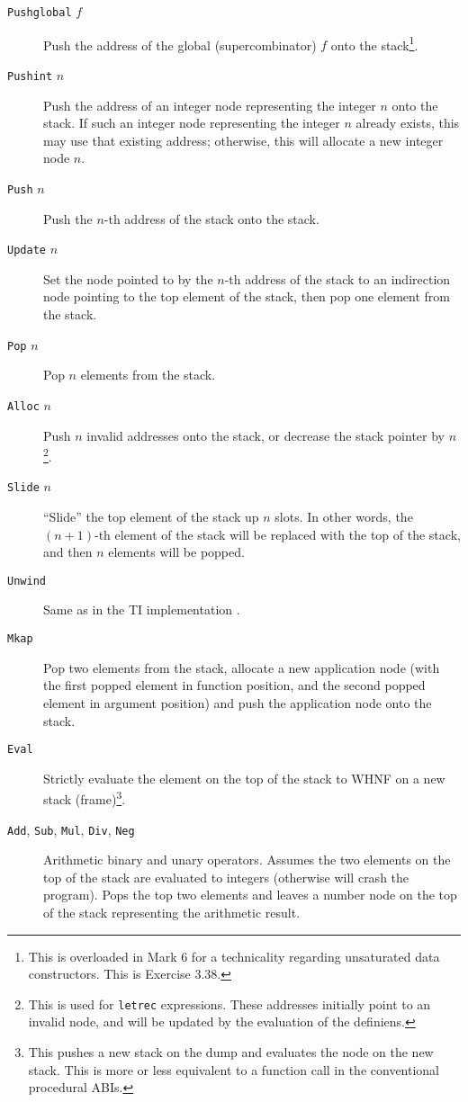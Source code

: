 \begin{description}
\item[\texttt{Pushglobal} $f$] Push the address of the global (supercombinator) $f$ onto the stack\footnote{This is overloaded in Mark 6 for a technicality regarding unsaturated data constructors. This is Exercise 3.38.}.
\item[\texttt{Pushint} $n$] Push the address of an integer node representing the integer $n$ onto the stack. If such an integer node representing the integer $n$ already exists, this may use that existing address; otherwise, this will allocate a new integer node $n$.
\item[\texttt{Push} $n$] Push the $n$-th address of the stack onto the stack.
\item[\texttt{Update} $n$] Set the node pointed to by the $n$-th address of the stack to an indirection node pointing to the top element of the stack, then pop one element from the stack.
\item[\texttt{Pop} $n$] Pop $n$ elements from the stack.
\item[\texttt{Alloc} $n$] Push $n$ invalid addresses onto the stack, or decrease the stack pointer by $n$ \footnote{This is used for \texttt{letrec} expressions. These addresses initially point to an invalid node, and will be updated by the evaluation of the definiens.}.
\item[\texttt{Slide} $n$] ``Slide'' the top element of the stack up $n$ slots. In other words, the $(n+1)$-th element of the stack will be replaced with the top of the stack, and then $n$ elements will be popped.
\item[\texttt{Unwind}] Same as in the TI implementation .
\item[\texttt{Mkap}] Pop two elements from the stack, allocate a new application node (with the first popped element in function position, and the second popped element in argument position) and push the application node onto the stack.
\item[\texttt{Eval}] Strictly evaluate the element on the top of the stack to WHNF on a new stack (frame)\footnote{This pushes a new stack on the dump and evaluates the node on the new stack. This is more or less equivalent to a function call in the conventional procedural ABIs.}.
\item[\texttt{Add}, \texttt{Sub}, \texttt{Mul}, \texttt{Div}, \texttt{Neg}] Arithmetic binary and unary operators. Assumes the two elements on the top of the stack are evaluated to integers (otherwise will crash the program). Pops the top two elements and leaves a number node on the top of the stack representing the arithmetic result.

\end{description}
